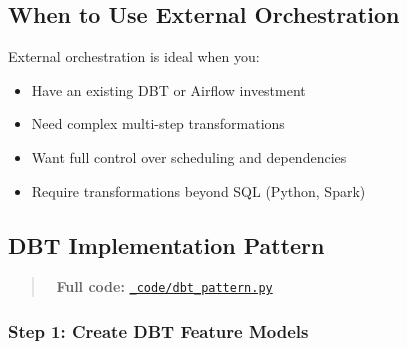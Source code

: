 \documentclass[
  letterpaper,
  DIV=11,
  numbers=noendperiod]{scrreprt}
\providecommand{\tightlist}{%
  \setlength{\itemsep}{0pt}\setlength{\parskip}{0pt}}\usepackage{longtable,booktabs,array}
\begin{document}
\hypertarget{when-to-use-external-orchestration}{%
\subsection{When to Use External
Orchestration}\label{when-to-use-external-orchestration}}

External orchestration is ideal when you:

\begin{itemize}
\tightlist
\item
  Have an existing DBT or Airflow investment
\item
  Need complex multi-step transformations
\item
  Want full control over scheduling and dependencies
\item
  Require transformations beyond SQL (Python, Spark)
\end{itemize}

\hypertarget{dbt-implementation-pattern}{%
\subsection{DBT Implementation
Pattern}\label{dbt-implementation-pattern}}

\begin{quote}
📁 \textbf{Full code:}
\href{_code/dbt_pattern.py}{\texttt{\_code/dbt\_pattern.py}}
\end{quote}

\hypertarget{step-1-create-dbt-feature-models}{%
\subsubsection{Step 1: Create DBT Feature
Models}\label{step-1-create-dbt-feature-models}}
\end{document}
